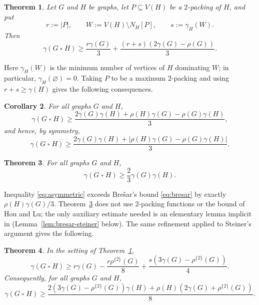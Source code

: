 \documentclass[10pt]{amsart}
\newtheorem{theorem}{Theorem}[section]
\newtheorem{corollary}[theorem]{Corollary}
\theoremstyle{remark}
\newcommand{\N}{N}
\newcommand{\V}{V}
\newcommand{\rhoTwo}{\rho^{\{2\}}}
\begin{document}
\begin{theorem}\label{thm:main-packing}
Let $G$ and $H$ be graphs, let $P\subseteq\V(H)$ be a $2$-packing of $H$, and
put
\[
 r:=|P|,\qquad W:=\V(H)\setminus\N_H[P],\qquad s:=\gamma_H(W).
\]
Then
\begin{equation}
 \gamma(G\mathbin{\square}H)
 \geq \frac{r\gamma(G)}{3}
 +\frac{(r+s)(2\gamma(G)-\rho(G))}{3}.
 \label{eq:main-packing}
\end{equation}
\end{theorem}

Here $\gamma_H(W)$ is the minimum number of vertices of $H$ dominating $W$;
in particular, $\gamma_H(\varnothing)=0$. Taking $P$ to be a maximum
$2$-packing and using $r+s\geq\gamma(H)$ gives the following consequences.

\begin{corollary}\label{cor:asymmetric}
For all graphs $G$ and $H$,
\begin{equation}
 \gamma(G\mathbin{\square}H)
 \geq
 \frac{2\gamma(G)\gamma(H)+\rho(H)\gamma(G)-\rho(G)\gamma(H)}{3},
 \label{eq:asymmetric}
\end{equation}
and hence, by symmetry,
\begin{equation}
 \gamma(G\mathbin{\square}H)
 \geq
 \frac{2\gamma(G)\gamma(H)
 +|\rho(H)\gamma(G)-\rho(G)\gamma(H)|}{3}.
 \label{eq:symmetric}
\end{equation}
\end{corollary}

\begin{theorem}\label{thm:two-thirds}
For all graphs $G$ and $H$,
\[
 \gamma(G\mathbin{\square}H)\geq \frac23\gamma(G)\gamma(H).
\]
\end{theorem}

Inequality \eqref{eq:asymmetric} exceeds Bre\v{s}ar's bound
\eqref{eq:bresar} by exactly $\rho(H)\gamma(G)/3$. Theorem~\ref{thm:two-thirds}
does not use $2$-packing functions or the bound of Hou and Lu; the only
auxiliary estimate needed is an elementary lemma implicit in
\cite{Bresar2017} (Lemma~\ref{lem:bresar-steiner} below). The same refinement
applied to Steiner's argument gives the following.

\begin{theorem}\label{thm:packing-function}
In the setting of Theorem~\ref{thm:main-packing},
\begin{equation}
 \gamma(G\mathbin{\square}H)
 \geq r\gamma(G)-\frac{r\rhoTwo(G)}8
 +\frac{s(3\gamma(G)-\rhoTwo(G))}{4}.
 \label{eq:packing-function}
\end{equation}
Consequently, for all graphs $G$ and $H$,
\begin{equation}
 \gamma(G\mathbin{\square}H)
 \geq
 \frac{2(3\gamma(G)-\rhoTwo(G))\gamma(H)
 +\rho(H)(2\gamma(G)+\rhoTwo(G))}{8}.
 \label{eq:packing-function-global}
\end{equation}
\end{theorem}
\end{document}
